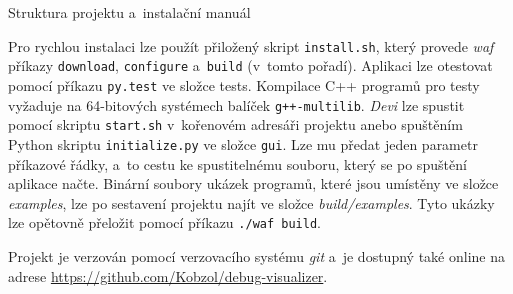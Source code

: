 \documentclass[czech,bachelor,male,python,dept460,hidelinks]{diploma}						%
\newcommand{\parspace}[1][]{
	\ifthenelse{\isempty{#1}}{\vspace{0mm}}{\vspace{#1}}
	\par
}
\begin{document}
\begin{section}{Struktura projektu a~instalační manuál}
	\parspace Pro rychlou instalaci lze použít přiložený skript \texttt{install.sh}, který provede \textit{waf} příkazy \texttt{download}, \texttt{configure}
	a~\texttt{build} (v~tomto pořadí).
	Aplikaci lze otestovat pomocí příkazu \texttt{py.test} ve složce tests. Kompilace C++ programů pro testy vyžaduje na 64-bitových systémech
	balíček \texttt{g++-multilib}.
	\textit{Devi} lze spustit pomocí skriptu \texttt{start.sh} v~kořenovém adresáři projektu anebo spuštěním Python skriptu \texttt{initialize.py}
	ve složce \texttt{gui}. Lze mu předat jeden parametr příkazové řádky, a~to cestu ke spustitelnému souboru, který se po spuštění aplikace načte.
	Binární soubory ukázek programů, které jsou umístěny ve složce \textit{examples}, lze po sestavení projektu najít ve složce \textit{build/examples}.
	Tyto ukázky lze opětovně přeložit pomocí příkazu \texttt{./waf build}.
	
	\parspace Projekt je verzován pomocí verzovacího systému \textit{git} a~je dostupný také online na adrese \url{https://github.com/Kobzol/debug-visualizer}.
\end{section}

\clearpage
\end{document}
